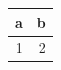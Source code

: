 \documentclass[11pt]{article}
\author{root}
\date{\today}
\title{}
\begin{document}
\tableofcontents

\begin{center}
\begin{tabular}{r|r}
a & b\\[0pt]
\hline
1 & 2\\[0pt]
\end{tabular}
\end{center}
\end{document}
